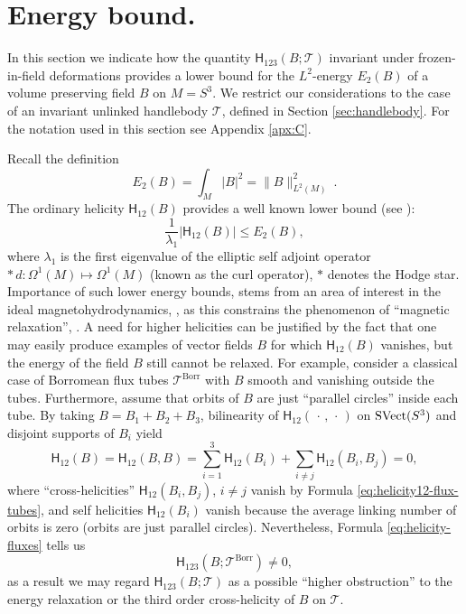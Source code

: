 \documentclass[12pt]{article}
\numberwithin{equation}{section}
\newcommand{\no}{\noindent}
\begin{document}

\section{Energy bound.}\label{sec:energy}

\no In this section we indicate how the quantity $\mathsf{H}_{123}(B;\mathcal{T})$ invariant under frozen-in-field deformations provides a lower bound for the  $L^2$-energy $E_2(B)$ of a volume preserving field $B$ on $M=S^3$. We restrict our considerations to the case of an invariant unlinked  handlebody  $\mathcal{T}$, defined in Section \ref{sec:handlebody}. For the notation used in this section see Appendix \ref{apx:C}.


Recall the definition
\begin{equation}\label{eq:energy}
 E_2(B)=\int_M |B|^2 = \|B\|^2_{L^2(M)}\ .
\end{equation}
The ordinary helicity $\mathsf{H}_{12}(B)$ provides a well known lower bound (see \cite[p. 123]{Khesin98}):
\[
  \frac{1}{\lambda_1}|\mathsf{H}_{12}(B)|\leq  E_2(B),
\]
where $\lambda_1$ is the first eigenvalue of the elliptic self adjoint operator $\ast\,d:\Omega^1(M)\mapsto \Omega^1(M)$
(known as the curl operator), $\ast$ denotes the Hodge star. Importance of such lower energy bounds,
 stems from an area of interest in the ideal magnetohydrodynamics, \cite{Priest84}, as this constrains the phenomenon of ``magnetic relaxation'', \cite{Freedman99}.
A need for higher helicities can be justified by the fact that one may easily produce examples of vector fields $B$ for which $\mathsf{H}_{12}(B)$ vanishes, but the energy of the field $B$ still cannot be relaxed. For example, consider a classical case of Borromean flux tubes $\mathcal{T}^\text{Borr}$ with $B$ smooth and vanishing outside the tubes. Furthermore, assume that orbits of $B$ are just ``parallel 
circles'' inside each tube. By taking $B=B_1+B_2+B_3$, bilinearity of $\mathsf{H}_{12}(\,\cdot\,,\,\cdot\,)$ on $\text{\rm SVect}(S^3)$ and disjoint supports of $B_i$  yield
\[
 \mathsf{H}_{12}(B)=\mathsf{H}_{12}(B,B)=\sum^3_{i=1}\mathsf{H}_{12}(B_i)+\sum_{i\neq j} \mathsf{H}_{12}(B_i,B_j)=0,
\]
where ``cross-helicities'' $\mathsf{H}_{12}(B_i,B_j)$, $i\neq j$ vanish by Formula \eqref{eq:helicity12-flux-tubes}, and self helicities $\mathsf{H}_{12}(B_i)$ vanish because the average linking number of orbits is zero (orbits are just parallel 
circles). Nevertheless, Formula \eqref{eq:helicity-fluxes} tells us 
\[
\mathsf{H}_{123}(B;\mathcal{T}^\text{Borr})\neq 0,
\]
as a result we may regard $\mathsf{H}_{123}(B;\mathcal{T})$ as a possible ``higher obstruction'' to the energy relaxation or the third order cross-helicity of $B$ on $\mathcal{T}$.
\end{document}
